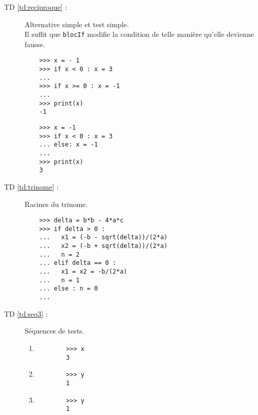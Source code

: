 \begin{description}
\item[TD \ref{td:reciproque} :] Alternative simple et test simple.\\
	Il suffit que {\tt blocIf} modifie la condition de telle
	manière qu'elle devienne fausse.
	
	\begin{py}{5cm}
	\begin{verbatim}
	>>> x = - 1
	>>> if x < 0 : x = 3
	... 
	>>> if x >= 0 : x = -1
	... 
	>>> print(x)
	-1
	\end{verbatim}
	\end{py}
	\hfill
	\begin{py}{5cm}
	\begin{verbatim}
	>>> x = -1
	>>> if x < 0 : x = 3
	... else: x = -1
	... 
	>>> print(x)
	3
	\end{verbatim}
	\end{py}
	
\item[TD \ref{td:trinome} :] Racines du trinome.

	\begin{py}{12cm}
	\begin{verbatim}
	>>> delta = b*b - 4*a*c
	>>> if delta > 0 :
	...   x1 = (-b - sqrt(delta))/(2*a)
	...   x2 = (-b + sqrt(delta))/(2*a)
	...   n = 2
	... elif delta == 0 :
	...   x1 = x2 = -b/(2*a)
	...   n = 1
	... else : n = 0
	... 
	\end{verbatim}
	\end{py}

\item[TD \ref{td:seq3} :] Séquences de tests.
	\begin{enumerate}
	\item 

		\begin{py}{12cm}
		\begin{verbatim}
		>>> x
		3
		\end{verbatim}
		\end{py}

	\item 

		\begin{py}{12cm}
		\begin{verbatim}
		>>> y
		1
		\end{verbatim}
		\end{py}

	\item 

		\begin{py}{12cm}
		\begin{verbatim}
		>>> y
		1
		\end{verbatim}
		\end{py}


\end{enumerate}
\end{description}
